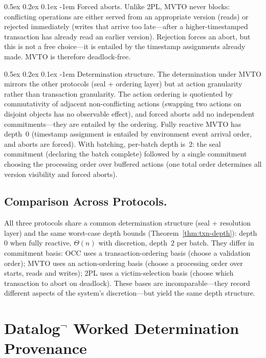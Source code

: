\documentclass[acmsmall,review,anonymous]{acmart}
\makeatletter
\renewcommand{\paragraph}{\@startsection{paragraph}{4}{\z@}%
  {0.5ex \@plus 0.2ex \@minus 0.1ex}%
  {-1em}%
  {\normalfont\normalsize\bfseries}}
\theoremstyle{remark}
\numberwithin{definition}{section}
\numberwithin{theorem}{section}
\numberwithin{lemma}{section}
\numberwithin{corollary}{section}
\numberwithin{remark}{section}
\numberwithin{example}{section}
\numberwithin{observation}{section}
\numberwithin{assumption}{section}
\makeatother
\begin{document}
\paragraph{Forced aborts.}
Unlike 2PL, MVTO never blocks: conflicting operations are either
served from an appropriate version (reads) or rejected immediately
(writes that arrive too late---after a higher-timestamped transaction
has already read an earlier version).
Rejection forces an abort, but this is not a free choice---it
is entailed by the timestamp assignments already made.
MVTO is therefore deadlock-free.

\paragraph{Determination structure.}
The determination under MVTO mirrors the other protocols (seal +
ordering layer) but at action granularity rather than transaction
granularity.
The action ordering is quotiented by commutativity of adjacent
non-conflicting actions (swapping two actions on disjoint objects has
no observable effect), and forced aborts add no independent
commitments---they are entailed by the ordering.
Fully reactive MVTO has depth~$0$ (timestamp assignment is
entailed by environment event arrival order, and aborts are forced).
With batching, per-batch depth is~$2$: the seal commitment (declaring
the batch complete) followed by a single commitment choosing the
processing order over buffered actions (one total order determines all
version visibility and forced aborts).

\subsection{Comparison Across Protocols.}
All three protocols share a common determination structure (seal +
resolution layer) and the same worst-case depth bounds
(Theorem~\ref{thm:txn-depth}): depth~$0$ when fully reactive,
$\Theta(n)$ with discretion, depth~$2$ per batch.
They differ in commitment basis:
OCC uses a transaction-ordering basis (choose a validation order);
MVTO uses an action-ordering basis (choose a processing order over starts,
reads and writes);
2PL uses a victim-selection basis (choose which transaction to abort
on deadlock).
These bases are incomparable---they record different aspects of the
system's discretion---but yield the same depth structure.

\section[Datalog with Negation: Worked Determination Provenance]{Datalog$^{\neg}$ Worked Determination Provenance}
\label{sec:appendix-datalog}
\end{document}
